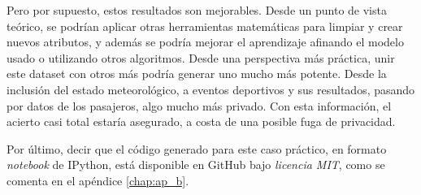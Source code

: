 Pero por supuesto, estos resultados son mejorables. Desde un punto de vista teórico, se podrían aplicar otras herramientas matemáticas para limpiar y crear nuevos atributos, y además se podría mejorar el aprendizaje afinando el modelo usado o utilizando otros algoritmos. Desde una perspectiva más práctica, unir este dataset con otros más podría generar uno mucho más potente. Desde la inclusión del estado meteorológico, a eventos deportivos y sus resultados, pasando por datos de los pasajeros, algo mucho más privado. Con esta información, el acierto casi total estaría asegurado, a costa de una posible fuga de privacidad. 

Por último, decir que el código generado para este caso práctico, en formato \emph{notebook} de IPython, está disponible en GitHub bajo \emph{licencia MIT}, como se comenta en el apéndice \ref{chap:ap_b}.
